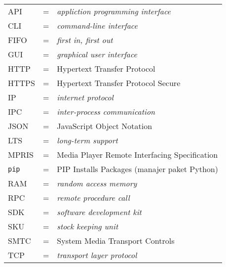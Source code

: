 \begin{tabular}{llp{3in}}
    API & \hspace{1.5cm} = & \textit{appliction programming interface}\\
    CLI & \hspace{1.5cm} = & \textit{command-line interface}\\
    FIFO & \hspace{1.5cm} = & \textit{first in, first out}\\
    GUI & \hspace{1.5cm} = & \textit{graphical user interface}\\
    HTTP & \hspace{1.5cm} = & Hypertext Transfer Protocol\\
    HTTPS & \hspace{1.5cm} = & Hypertext Transfer Protocol Secure\\
    IP & \hspace{1.5cm} = & \textit{internet protocol}\\
    IPC & \hspace{1.5cm} = & \textit{inter-process communication}\\
    JSON & \hspace{1.5cm} = & JavaScript Object Notation\\
    LTS & \hspace{1.5cm} = & \textit{long-term support}\\
    MPRIS & \hspace{1.5cm} = & Media Player Remote Interfacing Specification\\
    \verb|pip| & \hspace{1.5cm} = & PIP Installs Packages (manajer paket Python)\\
    RAM & \hspace{1.5cm} = & \textit{random access memory}\\
    RPC & \hspace{1.5cm} = & \textit{remote procedure call}\\
    SDK & \hspace{1.5cm} = & \textit{software development kit}\\
    SKU & \hspace{1.5cm} = & \textit{stock keeping unit}\\
    SMTC & \hspace {1.5cm} = & System Media Transport Controls\\
    TCP & \hspace{1.5cm} = & \textit{transport layer protocol}\\

\end{tabular}
